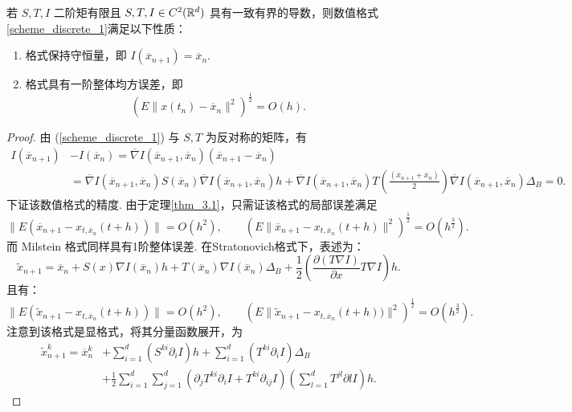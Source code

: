 \begin{theorem}
	若 $S,T,I$ 二阶矩有限且 $S,T,I \in C^2(\mathbb{R}^d)$ 具有一致有界的导数，则数值格式\ref{scheme_discrete_1}满足以下性质：
	\begin{enumerate}
		\item 格式保持守恒量，即 $I(\overline x_{n+1}) = \overline x_n$.
		\item 格式具有一阶整体均方误差，即
			\[
			(E \| x(t_n) - \overline x_n\| ^2 )^{\frac12} = O(h). 
			\]
	\end{enumerate}
\end{theorem}
\begin{proof}
	由 (\ref{scheme_discrete_1}) 与 $S,T$ 为反对称的矩阵，有
	\[
	\begin{aligned}
	I(\overline x_{n+1})& - I(\overline x_n) = \overline\nabla I(\overline x_{n+1} , \overline x_n)(\overline{ x }_{n+1} -\overline x_n ) \\
	&= \overline\nabla I(\overline x_{n+1} , \overline x_n) S(\overline x_n) \overline\nabla I(\overline x_{n+1} , \overline x_n) h + 
	\overline\nabla I(\overline x_{n+1} , \overline x_n) T(\frac{(\overline x_{n+1} + \overline x_n)}{2}) \overline\nabla I(\overline x_{n+1} , \overline x_n) \Delta_B = 0.
	\end{aligned}
	\]
	下证该数值格式的精度. 由于定理\ref{thm_3.1}，只需证该格式的局部误差满足
	\begin{equation}\label{eq5.9}
	\| E(\overline x_{n+1} -  x_{t,\overline x_n}(t+h) ) \| = O(h^2),\qquad
	\left( E\| \overline x_{n+1} - x_{t,\overline x_n}(t+h) \| ^2 \right) ^{\frac12} = O(h^{\frac32}). 
	\end{equation}
	而 Milstein 格式同样具有1阶整体误差. 在Stratonovich格式下，表述为：
	\[
	\tilde x_{n+1} = \overline x_n+S(x)\nabla I(\overline x_n) h + T(\overline x_n) \nabla I(\overline x_n) \Delta_B + \frac12\left( \frac{\partial (T\nabla I)}{\partial x}  T \nabla I\right) h. 
	\]
	且有：
	\[
	\| E(\tilde x_{n+1} - x_{t,\overline x_n}(t+h)) \| = O(h^2),\qquad
	\left( E\| \tilde x_{n+1} - x_{t,\overline x_n}(t+h) )\| ^2 \right) ^{\frac12} = O(h^{\frac32}). 
	\]
	注意到该格式是显格式，将其分量函数展开，为
	\begin{equation}
	\begin{aligned} 
		\tilde x^k_{n+1} = \overline x_n^k& + \sum_{i=1}^d (S^{ki} \partial _i I)h +\sum_{i=1}^d (T^{ki}\partial _i I) \Delta_B  \\
		&+\frac12 \sum_{i=1}^d \sum_{j=1}^d (\partial_j T^{ki}\partial_iI + T^{ki} \partial _{ij}I) \left( \sum_{l=1}^d T^{jl}\partial l I \right) h.
	\end{aligned}
	\end{equation}
	

\end{proof}
